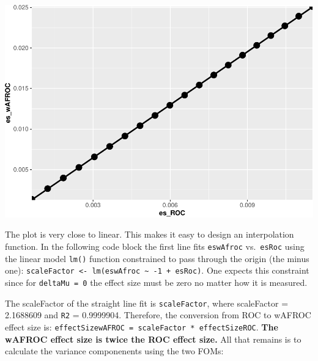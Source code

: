 \documentclass[
]{book}
\newenvironment{Shaded}{\begin{snugshade}}{\end{snugshade}}
\newcommand{\CommentTok}[1]{\textcolor[rgb]{0.56,0.35,0.01}{\textit{#1}}}
\newcommand{\DecValTok}[1]{\textcolor[rgb]{0.00,0.00,0.81}{#1}}
\newcommand{\FloatTok}[1]{\textcolor[rgb]{0.00,0.00,0.81}{#1}}
\newcommand{\KeywordTok}[1]{\textcolor[rgb]{0.13,0.29,0.53}{\textbf{#1}}}
\newcommand{\NormalTok}[1]{#1}
\newcommand{\OperatorTok}[1]{\textcolor[rgb]{0.81,0.36,0.00}{\textbf{#1}}}
\newcommand{\StringTok}[1]{\textcolor[rgb]{0.31,0.60,0.02}{#1}}
\begin{document}
\begin{center}\includegraphics{17-FrocSampleSize1_files/figure-latex/unnamed-chunk-9-1} \end{center}

The plot is very close to linear. This makes it easy to design an interpolation function. In the following code block the first line fits \texttt{eswAfroc} vs.~\texttt{esRoc} using the linear model \texttt{lm()} function constrained to pass through the origin (the minus one): \texttt{scaleFactor\ \textless{}-\ lm(eswAfroc\ \textasciitilde{}\ -1\ +\ esRoc)}. One expects this constraint since for \texttt{deltaMu\ =\ 0} the effect size must be zero no matter how it is measured.

\begin{Shaded}
\end{Shaded}

The scaleFactor of the straight line fit is \texttt{scaleFactor}, where scaleFactor = 2.1688609 and \texttt{R2} = 0.9999904. Therefore, the conversion from ROC to wAFROC effect size is: \texttt{effectSizewAFROC\ =\ scaleFactor\ *\ effectSizeROC}. \textbf{The wAFROC effect size is twice the ROC effect size.} All that remains is to calculate the variance componenents using the two FOMs:
\end{document}
